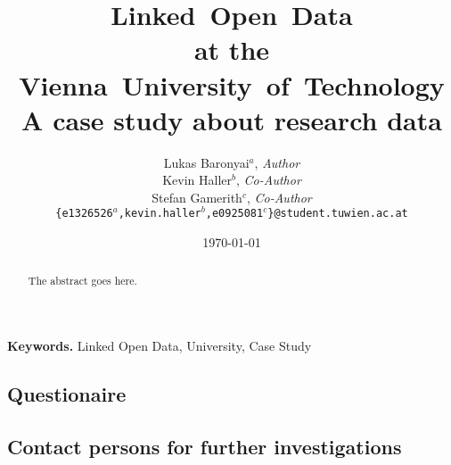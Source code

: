 \documentclass[pdftex,a4paper,10pt]{article}
\begin{document}
\pagestyle{plain}
\setlength{\tabcolsep}{10pt}
\title{Linked~Open~Data\\
	   at the\\
	   Vienna~University~of~Technology\\
	   \large A case study about research data}
\author{Lukas Baronyai$^a$, \textit{Author}\\
		Kevin Haller$^b$, \textit{Co-Author}\\
		Stefan Gamerith$^c$, \textit{Co-Author}\\
	\texttt{\{e1326526$^a$,kevin.haller$^b$,e0925081$^c$\}@student.tuwien.ac.at}}
\date{\today}

\maketitle

\begin{abstract}
The abstract goes here.
\end{abstract}

\vfill
\begin{center}
\textbf{Keywords.} Linked Open Data, University, Case Study
\end{center}

\newpage
\tableofcontents
\cleardoublepage
\listoffigures
{}








\cleardoublepage
{}
{}


\newpage

\begin{appendices}
	\subsection{Questionaire}
	
	\newpage
	\subsection{Contact persons for further investigations}
	\newpage
\end{appendices}
\end{document}
